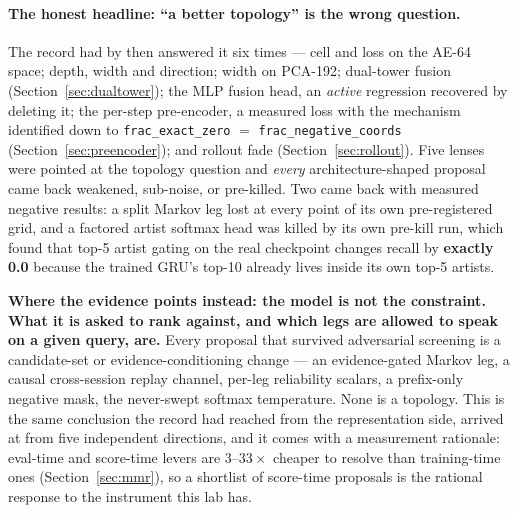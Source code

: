 \documentclass[11pt]{article}
\begin{document}
\paragraph{The honest headline: ``a better topology'' is the wrong question.} The
record had by then answered it six times --- cell and loss on the AE-64 space;
depth, width and direction; width on PCA-192; dual-tower fusion
(Section~\ref{sec:dualtower}); the MLP fusion head, an \emph{active} regression
recovered by deleting it; the per-step pre-encoder, a measured loss with the
mechanism identified down to \texttt{frac\_exact\_zero} $=$
\texttt{frac\_negative\_coords} (Section~\ref{sec:preencoder}); and rollout fade
(Section~\ref{sec:rollout}). Five lenses were pointed at the topology question
and \emph{every} architecture-shaped proposal came back weakened, sub-noise, or
pre-killed. Two came back with measured negative results: a split Markov leg lost
at every point of its own pre-registered grid, and a factored artist softmax head
was killed by its own pre-kill run, which found that top-5 artist gating on the
real checkpoint changes recall by \textbf{exactly \num{0.0}} because the trained
GRU's top-10 already lives inside its own top-5 artists.

\textbf{Where the evidence points instead: the model is not the constraint. What
it is asked to rank against, and which legs are allowed to speak on a given
query, are.} Every proposal that survived adversarial screening is a candidate-set
or evidence-conditioning change --- an evidence-gated Markov leg, a causal
cross-session replay channel, per-leg reliability scalars, a prefix-only negative
mask, the never-swept softmax temperature. None is a topology. This is the same
conclusion the record had reached from the representation side, arrived at from
five independent directions, and it comes with a measurement rationale: eval-time
and score-time levers are $\numrange{3}{33}\times$ cheaper to resolve than
training-time ones (Section~\ref{sec:mmr}), so a shortlist of score-time
proposals is the rational response to the instrument this lab has.
\end{document}

